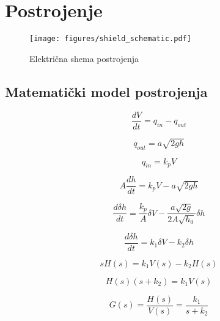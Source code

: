 \newpage
\newpage
\section{Postrojenje}

\begin{figure}[H]
\centering
\texttt{[image: figures/shield\_schematic.pdf]}
\caption{Električna shema postrojenja}
\end{figure}

\newpage
\subsection{Matematički model postrojenja}

\begin{equation} \frac{dV}{dt} = q_{in} - q_{out} \end{equation}

\begin{equation} q_{out} = a \sqrt{2gh} \end{equation}

\begin{equation} q_{in} = k_p V \end{equation}

\begin{equation} A\frac{dh}{dt} = k_p V - a \sqrt{2gh} \end{equation}

\begin{equation} \frac{d\delta h}{dt} = \frac{k_p}{A} \delta V -
                 \frac{a \sqrt{2g}}{2 A \sqrt{h_0}} \delta h \end{equation}

\begin{equation} \frac{d\delta h}{dt} = k_1 \delta V
                 - k_2 \delta h \end{equation}

\begin{equation} s H(s) = k_1 V(s) - k_2 H(s) \end{equation}

\begin{equation} H(s)(s+k_2) = k_1 V(s) \end{equation}

\begin{equation} G(s) = \frac{H(s)}{V(s)} = \frac{k_1}{s+k_2} \end{equation}

